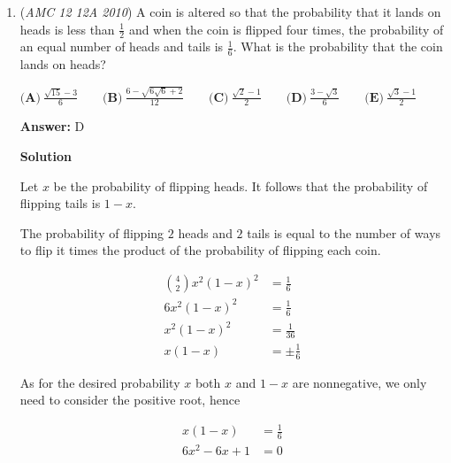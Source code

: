 \begin{enumerate}
 



\textbf{Solution 2(Trick)}

We find that $\frac{AB}{BC}=\frac{3}{8}$ by the \href{https://artofproblemsolving.com/wiki/index.php?title=Angle\_Bisector\_Theorem}{Angle Bisector Theorem} so we let the lengths be $3n$ and $8n$, respectively where $n$ is a positive integer. Also since $AD=3$ and $BC=8$, we notice that the perimeter of the triangle is the sum of these, namely $3n+8n+3+8=11n+11.$ This can be factored into $11(n+1)$ and so the sum must be a multiple of $11$. The only answer choice which is a multiple of $11$ is $\boxed{\textbf{(B)} 33}$. ~mathboy282

 


	\item (\textit{AMC 12 12A 2010}) A coin is altered so that the probability that it lands on heads is less than $\frac{1}{2}$ and when the coin is flipped four times, the probability of an equal number of heads and tails is $\frac{1}{6}$. What is the probability that the coin lands on heads?


 $\textbf{(A)}\ \frac{\sqrt{15}-3}{6} \qquad \textbf{(B)}\ \frac{6-\sqrt{6\sqrt{6}+2}}{12} \qquad \textbf{(C)}\ \frac{\sqrt{2}-1}{2} \qquad \textbf{(D)}\ \frac{3-\sqrt{3}}{6} \qquad \textbf{(E)}\ \frac{\sqrt{3}-1}{2}$

 \textbf{Answer: }D



\textbf{Solution}

Let $x$ be the probability of flipping heads. It follows that the probability of flipping tails is $1-x$.

 The probability of flipping $2$ heads and $2$ tails is equal to the number of ways to flip it times the product of the probability of flipping each coin.

 
 \begin{align*}{4 \choose 2}x^2(1-x)^2 &= \frac{1}{6}\\ 6x^2(1-x)^2 &= \frac{1}{6}\\ x^2(1-x)^2 &= \frac{1}{36}\\ x(1-x) &= \pm\frac{1}{6}\end{align*}


 As for the desired probability $x$ both $x$ and $1-x$ are nonnegative, we only need to consider the positive root, hence

 
 \begin{align*}x(1-x) &= \frac{1}{6}\\ 6x^2-6x+1&=0\end{align*}



\end{enumerate}
